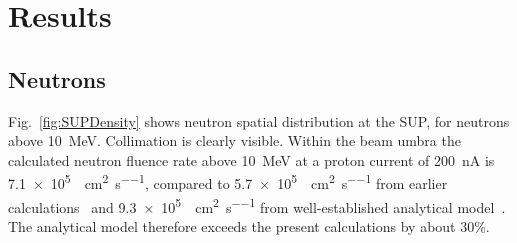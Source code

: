 \documentclass[peerreviewca,11pt,a4paper]{IEEEtran}
\begin{document}
\section{Results}

\subsection{Neutrons}
Fig.~\ref{fig:SUPDensity} shows neutron spatial distribution at the SUP, for neutrons above \SI{10}{\MeV}.
Collimation is clearly visible.
Within the beam umbra the calculated neutron fluence rate above \SI{10}{\MeV} at a proton current of \SI{200}{\nA} is \SI{7.1e5}{\neutron\per\cm\squared\per\second}, compared to \SI{5.7e5}{\neutron\per\cm\squared\per\second} from earlier calculations~\cite{Platt2013} and \SI{9.3e5}{\neutron\per\cm\squared\per\second} from well-established analytical model~\cite{Prokofiev2009}.
The analytical model therefore exceeds the present calculations by about 30\%.
\end{document}
